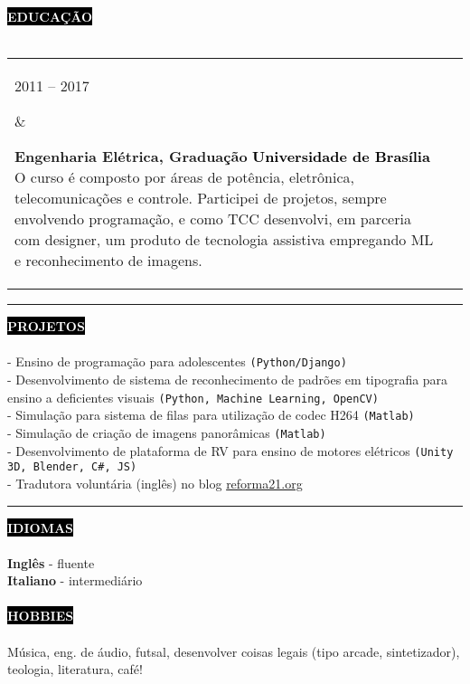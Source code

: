 \documentclass[10pt,A4]{article}
\makeatletter
\newcounter{a}
\newcounter{b}
\newcounter{c}
\newcommand{\cvsection}[1] {
	\textcolor{white}{\MakeUppercase{\textbf{#1}}}
}
\newcommand{\cvsect}[1]{
	\colorbox{black}{{\cvsection{#1}}}\\\\%
}
\newenvironment{entrylist}{%
	\begin{tabular*}{\textwidth}[t]{@{\extracolsep{\fill}}ll}
	}{%
	\end{tabular*}
}
\newcommand{\entry}[4]{%
	\parbox[t]{3.5cm}{%
		#1%
	}%
	&\parbox[t]{14cm}{%
		\textbf{#2}%
		\hfill%
		{\footnotesize \textbf{\textcolor{black}{#3}}}\\%
		#4%
	}\\\\}
\makeatother
\begin{document}
	\cvsect{Educação}
	\begin{entrylist}
		\entry
		{2011 – 2017}
		{Engenharia Elétrica, Graduação}
		{Universidade de Brasília}
		{O curso é composto por áreas de potência, eletrônica, telecomunicações e controle. Participei de projetos, sempre envolvendo programação, e como TCC desenvolvi, em parceria com designer, um produto de tecnologia assistiva empregando ML e reconhecimento de imagens.}
		\entry
		{2014 - 2015}
		{Ciência sem Fronteiras UK, Graduação Sanduíche}
		{Brunel University London}
		{O programa teve duração de 15 meses, no qual participei de curso intensivo de inglês acadêmico, projeto acadêmico de verão em processamento de vídeo (Matlab) e um ano do curso de graduação em engenharia elétrica e eletrônica, com ênfase em processamento de sinais digitais.}
	\end{entrylist}

	\begin{minipage}[t]{0.7\textwidth}\hrule height 0pt width 0pt%
		\cvsect{Projetos}
		- Ensino de programação para adolescentes \texttt{(Python/Django)}\\
		- Desenvolvimento de sistema de reconhecimento de padrões em tipografia para ensino a deficientes visuais \texttt{(Python, Machine Learning, OpenCV)}\\
		- Simulação para sistema de filas para utilização de codec H264 \texttt{(Matlab)}\\
		- Simulação de criação de imagens panorâmicas \texttt{(Matlab)}\\
		- Desenvolvimento de plataforma de RV para ensino de motores elétricos \texttt{(Unity 3D, Blender, C\#, JS)}\\
		- Tradutora voluntária (inglês) no blog {\href{https://reforma21.org/}{reforma21.org}}
	\end{minipage}%
	\hspace{1cm}
	\begin{minipage}[t]{0.27\textwidth}\hrule height 0pt width 0pt%
		\cvsect{Idiomas}
		\textbf{Inglês} - fluente\\
		\textbf{Italiano} - intermediário\\\\
		\cvsect{Hobbies}
		Música, eng. de áudio, futsal, desenvolver coisas legais (tipo arcade, sintetizador), teologia, literatura, café!
	\end{minipage}%
\end{document}
